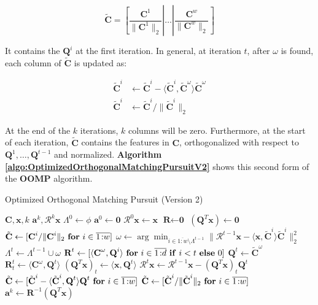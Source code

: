 \documentclass[12pt,a4paper,oneside,english]{UPBThesis}
\newcommand{\hcrange}[2]{\overline{{#1}\colon\!\!{#2}}}
\begin{document}
\begin{equation*}
\tilde{\textbf{C}} = \left[ \frac{\textbf{C}^1}{\|\textbf{C}^1\|_2} \left|\right. \dots \left|\right. \frac{\textbf{C}^w}{\|\textbf{C}^w\|_2} \right]
\end{equation*}

It contains the $\textbf{Q}^i$ at the first iteration. In general, at iteration $t$, after $\omega$ is found, each column of $\tilde{\textbf{C}}$ is updated as:

\begin{align*}
\tilde{\textbf{C}}^i & \gets \tilde{\textbf{C}}^i - \langle \tilde{\textbf{C}}^i, \tilde{\textbf{C}}^\omega \rangle \tilde{\textbf{C}}^\omega \\
\tilde{\textbf{C}}^i & \gets \tilde{\textbf{C}}^i / \| \tilde{\textbf{C}}^i \|_2
\end{align*}

At the end of the $k$ iterations, $k$ columns will be zero. Furthermore, at the start of each iteration, $\tilde{\textbf{C}}$ contains the features in $\textbf{C}$, orthogonalized with respect to $\textbf{Q}^1, \dots, \textbf{Q}^{t-1}$ and normalized. \textbf{Algorithm \ref{algo:OptimizedOrthogonalMatchingPursuitV2}} shows this second form of the \textbf{OOMP} algorithm.

\begin{algorithm}
\caption{Optimized Orthogonal Matching Pursuit (Version 2)}
\label{algo:OptimizedOrthogonalMatchingPursuitV2}
\begin{algorithmic}
\Require $\textbf{C},\textbf{x},k$
\Ensure $\textbf{a}^k,\mathcal{R}^k\textbf{x}$
\State $\Lambda^0 \gets \phi$
\State $\textbf{a}^0 \gets \textbf{0}$
\State $\mathcal{R}^0\textbf{x} \gets \textbf{x}$
\State $\textbf{R} \gets \textbf{0}$
\State $(\textbf{Q}^T\textbf{x}) \gets \textbf{0}$
\State $\tilde{\textbf{C}} \gets [ \textbf{C}^i / \|\textbf{C}^i\|_2 ~ \mbox{\textbf{for} $i \in \hcrange{1}{w}$} ]$
\For {$t = \hcrange{1}{k}$}
\State $\omega \gets \arg\min_{i \in \hcrange{1}{w} \setminus \Lambda^{t-1}} \| \mathcal{R}^{t-1}\textbf{x} - \langle \textbf{x}, \tilde{\textbf{C}}^i \rangle \tilde{\textbf{C}}^i \|_2^2$  
\State $\Lambda^t \gets \Lambda^{t-1} \cup \omega$
\State $\textbf{R}^t \gets [ \langle \textbf{C}^\omega, \textbf{Q}^i \rangle~\mbox{\textbf{for} $i \in \hcrange{1}{d}$ \textbf{if} $i < t$ \textbf{else} $0$} ]$ 
\State $\textbf{Q}^t \gets \tilde{\textbf{C}}^\omega$
\State $\textbf{R}^t_t \gets \langle \textbf{C}^\omega, \textbf{Q}^t \rangle$
\State $(\textbf{Q}^T\textbf{x})_t \gets \langle \textbf{x}, \textbf{Q}^t \rangle$
\State $\mathcal{R}^t\textbf{x} \gets \mathcal{R}^{t-1}\textbf{x} -  (\textbf{Q}^T\textbf{x})_t \textbf{Q}^t$
\State $\tilde{\textbf{C}} \gets [ \tilde{\textbf{C}}^i - \langle \tilde{\textbf{C}}^i, \textbf{Q}^t \rangle \textbf{Q}^t ~ \mbox{\textbf{for} $i \in \hcrange{1}{w}$} ]$
\State $\tilde{\textbf{C}} \gets [ \tilde{\textbf{C}}^i / \| \tilde{\textbf{C}}^i \|_2 ~ \mbox{\textbf{for} $i \in \hcrange{1}{w}$} ]$
\EndFor
\State $\textbf{a}^k \gets \textbf{R}^{-1}(\textbf{Q}^T\textbf{x})$
\end{algorithmic}
\end{algorithm}
\end{document}
